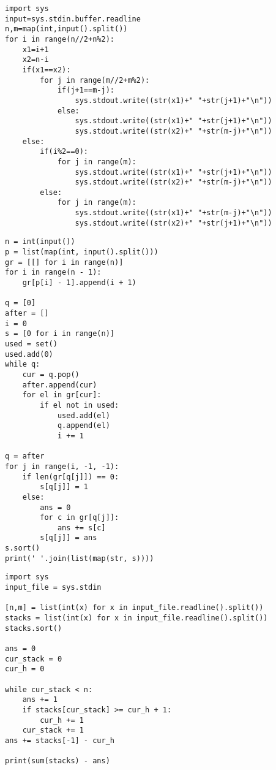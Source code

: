 \documentclass[12pt,twoside]{article}
\begin{document}
\begin{tcolorbox}[
  colback=gray!5,
  colframe=black,
  boxrule=0.5pt,
  breakable,
  title=$\mathcal{O}(n^2)$ catalogado correctamente,
]
\begin{verbatim}
import sys
input=sys.stdin.buffer.readline
n,m=map(int,input().split())
for i in range(n//2+n%2):
    x1=i+1
    x2=n-i
    if(x1==x2):
        for j in range(m//2+m%2):
            if(j+1==m-j):
                sys.stdout.write((str(x1)+" "+str(j+1)+"\n"))
            else:
                sys.stdout.write((str(x1)+" "+str(j+1)+"\n"))
                sys.stdout.write((str(x2)+" "+str(m-j)+"\n"))
    else:
        if(i%2==0):
            for j in range(m):
                sys.stdout.write((str(x1)+" "+str(j+1)+"\n"))
                sys.stdout.write((str(x2)+" "+str(m-j)+"\n"))
        else:
            for j in range(m):
                sys.stdout.write((str(x1)+" "+str(m-j)+"\n"))
                sys.stdout.write((str(x2)+" "+str(j+1)+"\n"))
\end{verbatim}
\end{tcolorbox}

\begin{tcolorbox}[
  colback=gray!5,
  colframe=black,
  boxrule=0.5pt,
  breakable,
  title=$\mathcal{O}(n\log n)$ catalogado como $\mathcal{O}(n)$,
]
\begin{verbatim}
n = int(input())
p = list(map(int, input().split()))
gr = [[] for i in range(n)]
for i in range(n - 1):
    gr[p[i] - 1].append(i + 1)

q = [0]
after = []
i = 0
s = [0 for i in range(n)]
used = set()
used.add(0)
while q:
    cur = q.pop()
    after.append(cur)
    for el in gr[cur]:
        if el not in used:
            used.add(el)
            q.append(el)
            i += 1

q = after
for j in range(i, -1, -1):
    if len(gr[q[j]]) == 0:
        s[q[j]] = 1
    else:
        ans = 0
        for c in gr[q[j]]:
            ans += s[c]
        s[q[j]] = ans
s.sort()
print(' '.join(list(map(str, s))))
\end{verbatim}
\end{tcolorbox}

\begin{tcolorbox}[
  colback=gray!5,
  colframe=black,
  boxrule=0.5pt,
  breakable,
  title=$\mathcal{O}(n\log n)$ catalogado correctamente,
]
\begin{verbatim}
import sys
input_file = sys.stdin

[n,m] = list(int(x) for x in input_file.readline().split())
stacks = list(int(x) for x in input_file.readline().split())
stacks.sort()

ans = 0
cur_stack = 0
cur_h = 0

while cur_stack < n:
    ans += 1
    if stacks[cur_stack] >= cur_h + 1:
        cur_h += 1
    cur_stack += 1
ans += stacks[-1] - cur_h

print(sum(stacks) - ans)
\end{verbatim}
\end{tcolorbox}
\end{document}
